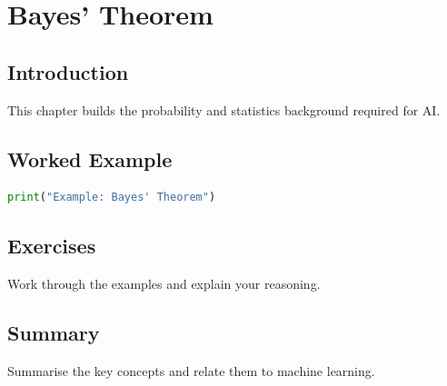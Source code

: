 \chapter{Bayes' Theorem}
\label{chap:vol4-24}



\section{Introduction}
This chapter builds the probability and statistics background required for AI.

\section{Worked Example}
\begin{lstlisting}[language=Python]
print("Example: Bayes' Theorem")
\end{lstlisting}

\section{Exercises}
\begin{exercise}
Work through the examples and explain your reasoning.
\end{exercise}

\section{Summary}
Summarise the key concepts and relate them to machine learning.
